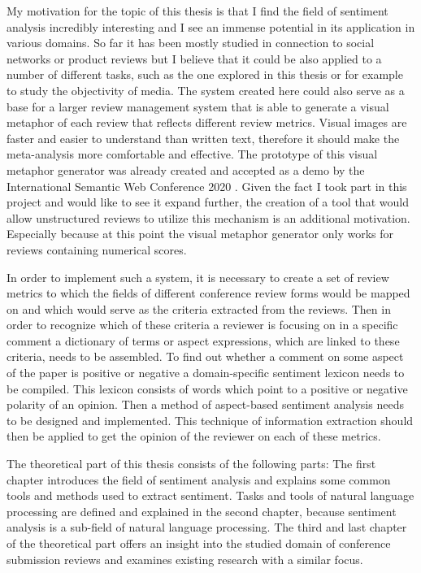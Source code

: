 My motivation for the topic of this thesis is that I find the field of sentiment analysis incredibly interesting and I see an immense potential in its application in various domains. So far it has been mostly studied in connection to social networks or product reviews but I believe that it could be also applied to a number of different tasks, such as the one explored in this thesis or for example to study the objectivity of media.
The system created here could also serve as a base for a larger review management system that is able to generate a visual metaphor of each review that reflects different review metrics. Visual images are faster and easier to understand than written text, therefore it should make the meta-analysis more comfortable and effective. The prototype of this visual metaphor generator was already created and accepted as a demo by the International Semantic Web Conference 2020 \cite{pictoreview_iswc}. Given the fact I took part in this project and would like to see it expand further, the creation of a tool that would allow unstructured reviews to utilize this mechanism is an additional motivation. Especially because at this point the visual metaphor generator only works for reviews containing numerical scores.

In order to implement such a system, it is necessary to create a set of review metrics to which the fields of different conference review forms would be mapped on and which would serve as the criteria extracted from the reviews. Then in order to recognize which of these criteria a reviewer is focusing on in a specific comment a dictionary of terms or aspect expressions, which are linked to these criteria, needs to be assembled. To find out whether a comment on some aspect of the paper is positive or negative a domain-specific sentiment lexicon needs to be compiled. This lexicon consists of words which point to a positive or negative polarity of an opinion. Then a method of aspect-based sentiment analysis needs to be designed and implemented. This technique of information extraction should then be applied to get the opinion of the reviewer on each of these metrics.

The theoretical part of this thesis consists of the following parts: The first chapter introduces the field of sentiment analysis and explains some common tools and methods used to extract sentiment. Tasks and tools of natural language processing are defined and explained in the second chapter, because sentiment analysis is a sub-field of natural language processing. The third and last chapter of the theoretical part offers an insight into the studied domain of conference submission reviews and examines existing research with a similar focus.

